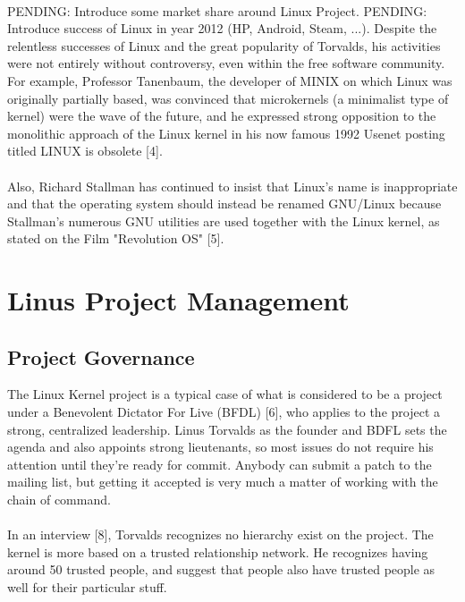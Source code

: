 \documentclass[11pt]{article}
\begin{document}
\\
PENDING: Introduce some market share around Linux Project.
PENDING: Introduce success of Linux in year 2012 (HP, Android, Steam, ...).
Despite the relentless successes of Linux and the great popularity of Torvalds, his activities were not entirely without controversy, even within the free software community. For example, Professor Tanenbaum, the developer of MINIX on which Linux was originally partially based, was convinced that microkernels (a minimalist type of kernel) were the wave of the future, and he expressed strong opposition to the monolithic approach of the Linux kernel in his now famous 1992 Usenet posting titled LINUX is obsolete [4].\\
\\
Also, Richard Stallman has continued to insist that Linux's name is inappropriate and that the operating system should instead be renamed GNU/Linux because Stallman's numerous GNU utilities are used together with the Linux kernel, as stated on the Film "Revolution OS" [5].
\section{Linus Project Management}
\subsection{Project Governance}
The Linux Kernel project is a typical case of what is considered to be a project under a Benevolent Dictator For Live (BFDL) [6], who applies to the project a strong, centralized leadership. Linus Torvalds as the founder and BDFL sets the agenda and also appoints strong lieutenants, so most issues do not require his attention until they're ready for commit. Anybody can submit a patch to the mailing list, but getting it accepted is very much a matter of working with the chain of command.\\
\\
In an interview [8], Torvalds recognizes no hierarchy exist on the project. The kernel is more based on a trusted relationship network. He recognizes having around 50 trusted people, and suggest that people also have trusted people as well for their particular stuff. 
\end{document}
